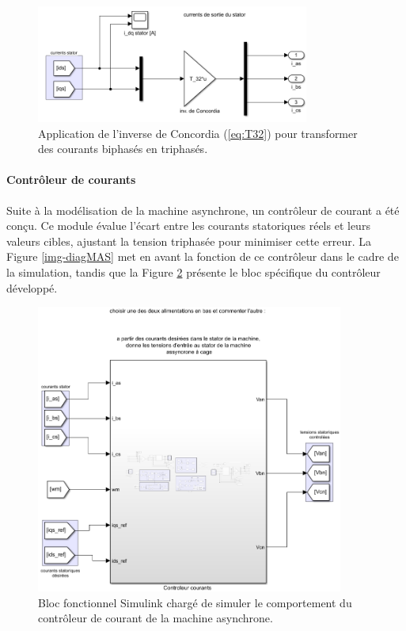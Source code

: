 \begin{figure}[!h]
    \centering
    \includegraphics[width=0.8\textwidth]{imgsMATLAB/MAS/MASblock/MASblock_currents_sortie_stator.png} 
    \caption{Application de l'inverse de Concordia (\ref{eq:T32}) pour transformer des courants biphasés en triphasés.}
    \label{img-MASblock_currents_sortie_stator}
\end{figure}



\FloatBarrier
\paragraph{Contrôleur de courants}

Suite à la modélisation de la machine asynchrone, un contrôleur de courant a été conçu. Ce module évalue l'écart entre les courants statoriques réels et leurs valeurs cibles, ajustant la tension triphasée pour minimiser cette erreur. La Figure \ref{img-diagMAS} met en avant la fonction de ce contrôleur dans le cadre de la simulation, tandis que la Figure \ref{img-MAS_controleur_current} présente le bloc spécifique du contrôleur développé. 

\begin{figure}[!h]
    \centering
    \includegraphics[width=0.9\textwidth]{imgsMATLAB/MAS/MAS/MAS_controleur_current.png} 
    \caption{Bloc fonctionnel Simulink chargé de simuler le comportement du contrôleur de courant de la machine asynchrone.}
    \label{img-MAS_controleur_current}
\end{figure}


